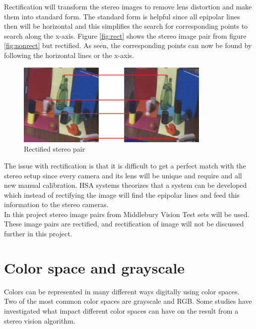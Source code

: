 Rectification will transform the stereo images to remove lens distortion and make them into standard form. The standard form is helpful since all epipolar lines then will be horizontal and this simplifies the search for corresponding points to search along the x-axis. Figure \vref{fig:rect} shows the stereo image pair from figure \vref{fig:nonrect} but rectified. As seen, the corresponding points can now be found by following the horizontal lines or the x-axis.\\

\begin{figure}[ht!]
  \centering
  \includegraphics[height=4cm]{figures/rect}
  \caption{Rectified stereo pair\label{fig:rect} \cite{Mattoccia2013}}
\end{figure}

The issue with rectification is that it is difficult to get a perfect match with the stereo setup since every camera and its lens will be unique and require and all new manual calibration. HSA systems theorizes that a system can be developed which instead of rectifying the image will find the epipolar lines and feed this information to the stereo cameras.\\

In this project stereo image pairs from Middlebury Vision Test sets \cite{middlebury2016} will be used. These image pairs are rectified, and rectification of image will not be discussed further in this project.

\section{Color space and grayscale}
Colors can be represented in many different ways digitally using color spaces. Two of the most common color spaces are grayscale and RGB. Some studies have investigated what impact different color spaces can have on the result from a stereo vision algorithm.\\ 

